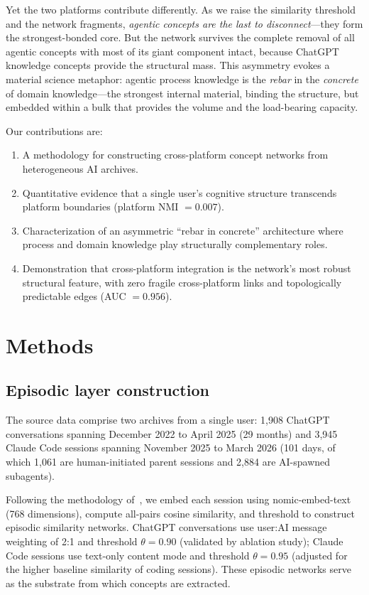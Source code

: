 \documentclass[11pt,twocolumn]{article}
\begin{document}
Yet the two platforms contribute differently.
As we raise the similarity threshold and the network fragments, \emph{agentic concepts are the last to disconnect}---they form the strongest-bonded core.
But the network survives the complete removal of all agentic concepts with most of its giant component intact, because ChatGPT knowledge concepts provide the structural mass.
This asymmetry evokes a material science metaphor: agentic process knowledge is the \emph{rebar} in the \emph{concrete} of domain knowledge---the strongest internal material, binding the structure, but embedded within a bulk that provides the volume and the load-bearing capacity.

Our contributions are:
\begin{enumerate}
  \item A methodology for constructing cross-platform concept networks from heterogeneous AI archives.
  \item Quantitative evidence that a single user's cognitive structure transcends platform boundaries (platform NMI $= 0.007$).
  \item Characterization of an asymmetric ``rebar in concrete'' architecture where process and domain knowledge play structurally complementary roles.
  \item Demonstration that cross-platform integration is the network's most robust structural feature, with zero fragile cross-platform links and topologically predictable edges (AUC $= 0.956$).
\end{enumerate}


\section{Methods}
\label{sec:methods}

\subsection{Episodic layer construction}

The source data comprise two archives from a single user: 1,908 ChatGPT conversations spanning December 2022 to April 2025 (29 months) and 3,945 Claude Code sessions spanning November 2025 to March 2026 (101 days, of which 1,061 are human-initiated parent sessions and 2,884 are AI-spawned subagents).

Following the methodology of~\citet{towell2025cognitive}, we embed each session using nomic-embed-text~\citep{nussbaum2024nomic,reimers2019sentence} (768 dimensions), compute all-pairs cosine similarity, and threshold to construct episodic similarity networks.
ChatGPT conversations use user:AI message weighting of 2:1 and threshold $\theta = 0.90$ (validated by ablation study); Claude Code sessions use text-only content mode and threshold $\theta = 0.95$ (adjusted for the higher baseline similarity of coding sessions).
These episodic networks serve as the substrate from which concepts are extracted.
\end{document}
